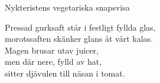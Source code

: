 \begin{song}{Nykteristens vegetariska snapsvisa}
	
	
	
	Pressad gurksaft står i festligt fyllda glas,\\
	morotssaften skänker glans åt vårt kalas.\\
	Magen brusar utav juicer,\\
	men där nere, fylld av hat,\\
	sitter djävulen till näsan i tomat.
	
\end{song}
